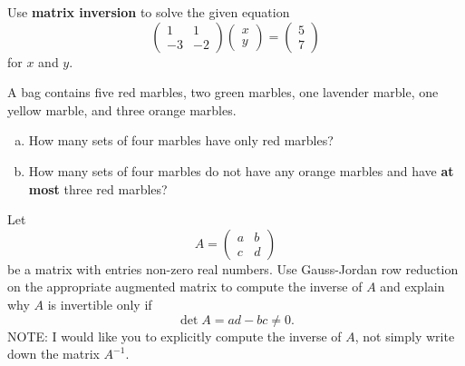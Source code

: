 \documentclass[12pt]{amsart}
\begin{document}
\begin{thm}[10 Points]
  Use {\bf matrix inversion} to solve the given equation
  $$\left(\begin{array}{rr}
    1 & 1 \\
    -3 & -2
  \end{array}\right) \left(\begin{array}{r}
    x \\
    y
  \end{array}\right) = \left(\begin{array}{r}
    5 \\
    7
  \end{array}\right)$$
  for $x$ and $y$.
  
\end{thm}
\newpage

\begin{thm}[10 Points]\label{ex1}
  A bag contains five red marbles, two green marbles, one lavender marble, one yellow marble, and three orange marbles.
  \begin{enumerate}[(a)]
  \item
    How many sets of four marbles have only red marbles?
    \vspace{2in}
  \item
    How many sets of four marbles do not have any orange marbles and have {\bf at most} three red marbles?
    \vspace{2in}
  \end{enumerate}
\end{thm}

\newpage

\begin{thm}\label{bonus}
  Let 
  $$A = \left(\begin{array}{cc} 
    a & b\\
    c & d
  \end{array}\right)$$
  be a matrix with entries non-zero real numbers.
  Use Gauss-Jordan row reduction on the appropriate augmented matrix to compute the inverse of $A$ and explain why $A$ is invertible only if
  $$\det{A} = ad - bc \neq 0.$$
  NOTE:  I would like you to explicitly compute the inverse of $A$, not simply write down the matrix $A^{-1}$.
\end{thm}

\newpage
\end{document}
